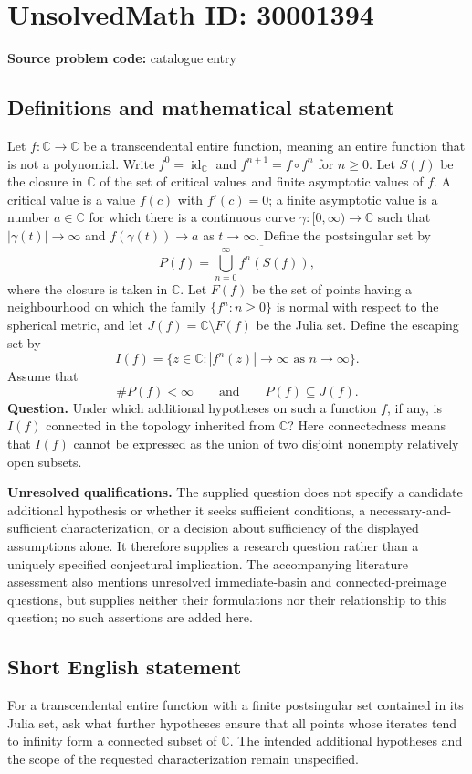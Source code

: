 \documentclass[11pt]{article}
\newcommand{\C}{\mathbb{C}}
\begin{document}
\section*{UnsolvedMath ID: 30001394}
\textbf{Source problem code:} catalogue entry
\subsection{Definitions and mathematical statement}
Let \(f\colon\C\to\C\) be a transcendental entire function, meaning an entire function that is not a polynomial. Write \(f^0=\operatorname{id}_{\C}\) and \(f^{n+1}=f\circ f^n\) for \(n\geq 0\). Let \(S(f)\) be the closure in \(\C\) of the set of critical values and finite asymptotic values of \(f\). A critical value is a value \(f(c)\) with \(f'(c)=0\); a finite asymptotic value is a number \(a\in\C\) for which there is a continuous curve \(\gamma\colon[0,\infty)\to\C\) such that \(|\gamma(t)|\to\infty\) and \(f(\gamma(t))\to a\) as \(t\to\infty\). Define the postsingular set by
\[
P(f)=\overline{\bigcup_{n=0}^{\infty}f^n(S(f))},
\]
where the closure is taken in \(\C\). Let \(F(f)\) be the set of points having a neighbourhood on which the family \(\{f^n:n\geq0\}\) is normal with respect to the spherical metric, and let \(J(f)=\C\setminus F(f)\) be the Julia set. Define the escaping set by
\[
I(f)=\{z\in\C:|f^n(z)|\longrightarrow\infty\text{ as }n\to\infty\}.
\]
Assume that
\[
\#P(f)<\infty\qquad\text{and}\qquad P(f)\subseteq J(f).
\]
\textbf{Question.} Under which additional hypotheses on such a function \(f\), if any, is \(I(f)\) connected in the topology inherited from \(\C\)? Here connectedness means that \(I(f)\) cannot be expressed as the union of two disjoint nonempty relatively open subsets.

\textbf{Unresolved qualifications.} The supplied question does not specify a candidate additional hypothesis or whether it seeks sufficient conditions, a necessary-and-sufficient characterization, or a decision about sufficiency of the displayed assumptions alone. It therefore supplies a research question rather than a uniquely specified conjectural implication. The accompanying literature assessment also mentions unresolved immediate-basin and connected-preimage questions, but supplies neither their formulations nor their relationship to this question; no such assertions are added here.
\subsection{Short English statement}
For a transcendental entire function with a finite postsingular set contained in its Julia set, ask what further hypotheses ensure that all points whose iterates tend to infinity form a connected subset of \(\C\). The intended additional hypotheses and the scope of the requested characterization remain unspecified.
\end{document}
